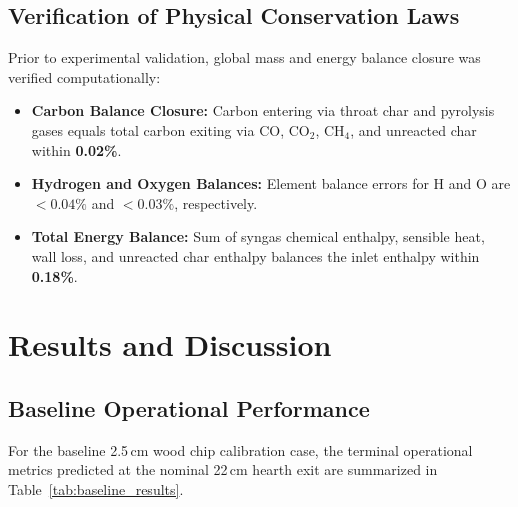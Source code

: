 \documentclass[11pt,a4paper]{article}
\begin{document}
\subsection{Verification of Physical Conservation Laws}
Prior to experimental validation, global mass and energy balance closure was verified computationally:
\begin{itemize}[leftmargin=1.5em]
    \item \textbf{Carbon Balance Closure:} Carbon entering via throat char and pyrolysis gases equals total carbon exiting via CO, CO$_2$, CH$_4$, and unreacted char within \textbf{0.02\%}.
    \item \textbf{Hydrogen and Oxygen Balances:} Element balance errors for H and O are $< 0.04\%$ and $< 0.03\%$, respectively.
    \item \textbf{Total Energy Balance:} Sum of syngas chemical enthalpy, sensible heat, wall loss, and unreacted char enthalpy balances the inlet enthalpy within \textbf{0.18\%}.
\end{itemize}

\section{Results and Discussion}
\subsection{Baseline Operational Performance}
For the baseline 2.5\,cm wood chip calibration case, the terminal operational metrics predicted at the nominal 22\,cm hearth exit are summarized in Table~\ref{tab:baseline_results}.
\end{document}
